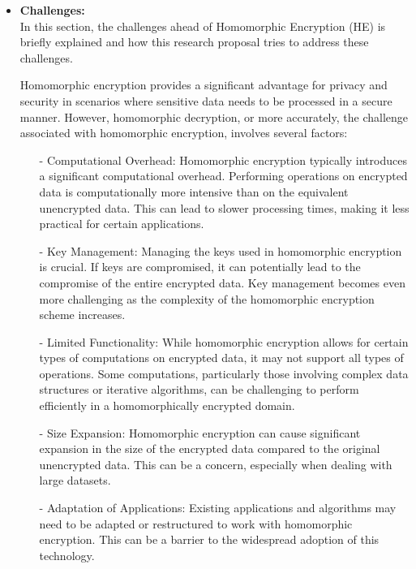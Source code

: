 \begin {itemize}
\begin{itemize}
\end{itemize}
As these algorithms are expected to shape future cryptographic systems, designing efficient embedded systems for their implementation is crucial. In the next section, I elaborate on my methods to address this challenge.
 \item [$\bullet$] { \bf Challenges:} \vspace{0.5em} \\
 In this section, the challenges ahead of  Homomorphic Encryption (HE) is briefly explained and how this research proposal tries to address these challenges.
 
Homomorphic encryption  provides a significant advantage for privacy and security in scenarios where sensitive data needs to be processed in a secure manner. However, homomorphic decryption, or more accurately, the challenge associated with homomorphic encryption, involves several factors:
\begin{itemize}

  \item[-]   Computational Overhead: Homomorphic encryption typically introduces a significant computational overhead. Performing operations on encrypted data is computationally more intensive than on the equivalent unencrypted data. This can lead to slower processing times, making it less practical for certain applications.

 \item[-]    Key Management: Managing the keys used in homomorphic encryption is crucial. If keys are compromised, it can potentially lead to the compromise of the entire encrypted data. Key management becomes even more challenging as the complexity of the homomorphic encryption scheme increases.

 \item[-]    Limited Functionality: While homomorphic encryption allows for certain types of computations on encrypted data, it may not support all types of operations. Some computations, particularly those involving complex data structures or iterative algorithms, can be challenging to perform efficiently in a homomorphically encrypted domain.

  \item[-]   Size Expansion: Homomorphic encryption can cause significant expansion in the size of the encrypted data compared to the original unencrypted data. This can be a concern, especially when dealing with large datasets.

   \item[-]  Adaptation of Applications: Existing applications and algorithms may need to be adapted or restructured to work with homomorphic encryption. This can be a barrier to the widespread adoption of this technology.
\end{itemize}


\end{itemize}
